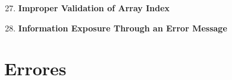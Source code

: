 \documentclass[a4paper,10pt]{article}
\begin{document}
\begin{enumerate}
 \setcounter{enumi}{26}
 \item \textbf{Improper Validation of Array Index}
 \setcounter{enumi}{38}
 \item \textbf{Information Exposure Through an Error Message}
\end{enumerate}


\section{Errores}










\end{document}
